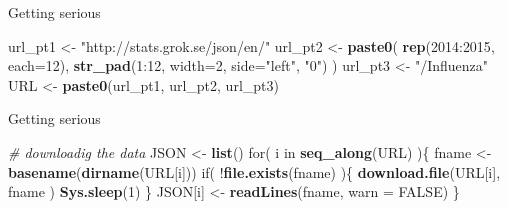 \documentclass[ignorenonframetext,]{beamer}
\newenvironment{Shaded}{\begin{snugshade}}{\end{snugshade}}
\newcommand{\KeywordTok}[1]{\textcolor[rgb]{0.13,0.29,0.53}{\textbf{{#1}}}}
\newcommand{\DataTypeTok}[1]{\textcolor[rgb]{0.13,0.29,0.53}{{#1}}}
\newcommand{\DecValTok}[1]{\textcolor[rgb]{0.00,0.00,0.81}{{#1}}}
\newcommand{\StringTok}[1]{\textcolor[rgb]{0.31,0.60,0.02}{{#1}}}
\newcommand{\CommentTok}[1]{\textcolor[rgb]{0.56,0.35,0.01}{\textit{{#1}}}}
\newcommand{\OtherTok}[1]{\textcolor[rgb]{0.56,0.35,0.01}{{#1}}}
\newcommand{\NormalTok}[1]{{#1}}
\begin{document}
\begin{frame}[fragile]{Getting serious}

\begin{Shaded}
\begin{Highlighting}[]
\NormalTok{url_pt1  <-}\StringTok{ "http://stats.grok.se/json/en/"}
\NormalTok{url_pt2  <-}\StringTok{ }
\StringTok{  }\KeywordTok{paste0}\NormalTok{(}
    \KeywordTok{rep}\NormalTok{(}\DecValTok{2014}\NormalTok{:}\DecValTok{2015}\NormalTok{, }\DataTypeTok{each=}\DecValTok{12}\NormalTok{),}
    \KeywordTok{str_pad}\NormalTok{(}\DecValTok{1}\NormalTok{:}\DecValTok{12}\NormalTok{, }\DataTypeTok{width=}\DecValTok{2}\NormalTok{, }\DataTypeTok{side=}\StringTok{"left"}\NormalTok{, }\StringTok{"0"}\NormalTok{)}
  \NormalTok{)}
\NormalTok{url_pt3  <-}\StringTok{ "/Influenza"}
\NormalTok{URL <-}\StringTok{ }\KeywordTok{paste0}\NormalTok{(url_pt1, url_pt2, url_pt3)}
\end{Highlighting}
\end{Shaded}

\end{frame}

\begin{frame}[fragile]{Getting serious}

\begin{Shaded}
\begin{Highlighting}[]
\CommentTok{# downloadig the data}
\NormalTok{JSON <-}\StringTok{ }\KeywordTok{list}\NormalTok{()}
\NormalTok{for( i in }\KeywordTok{seq_along}\NormalTok{(URL) )\{}
  \NormalTok{fname <-}\StringTok{ }\KeywordTok{basename}\NormalTok{(}\KeywordTok{dirname}\NormalTok{(URL[i]))}
  \NormalTok{if( !}\KeywordTok{file.exists}\NormalTok{(fname) )\{}
    \KeywordTok{download.file}\NormalTok{(URL[i], fname )}
    \KeywordTok{Sys.sleep}\NormalTok{(}\DecValTok{1}\NormalTok{)}
  \NormalTok{\}}
  \NormalTok{JSON[i] <-}\StringTok{ }\KeywordTok{readLines}\NormalTok{(fname, }\DataTypeTok{warn =} \OtherTok{FALSE}\NormalTok{)}
\NormalTok{\}}
\end{Highlighting}
\end{Shaded}

\end{frame}
\end{document}
